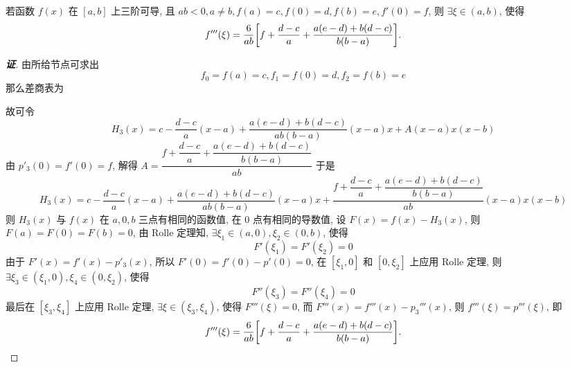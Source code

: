 \begin{theorem}
    若函数 $f(x)\text{ 在 }[a,b]$ 上三阶可导, 且 $ab<0,a\neq b,f(a)=c,f(0)=d,f(b)=e,f'(0)=f$, 则 $\exists\xi\in(a,b)$, 使得 $$f'''(\xi)=\dfrac{6}{ab}\qty[f+\dfrac{d-c}{a}+\dfrac{a(e-d)+b(d-c)}{b(b-a)}].$$
\end{theorem}
\begin{proof}[{\songti \textbf{证}}]
    由所给节点可求出 $$f_0=f(a)=c,f_1=f(0)=d,f_2=f(b)=e$$
    那么差商表为
    \begin{table}[H]
        \centering
        \caption{}
    \end{table}
    故可令 $$H_3(x)=c-\dfrac{d-c}{a}(x-a)+\dfrac{a(e-d)+b(d-c)}{ab(b-a)}(x-a)x+A(x-a)x(x-b)$$
    由 $p'_3(0)=f'(0)=f$, 解得 $A=\dfrac{f+\dfrac{d-c}{a}+\dfrac{a(e-d)+b(d-c)}{b(b-a)}}{ab}$
    于是 $$H_3(x)=c-\dfrac{d-c}{a}(x-a)+\dfrac{a(e-d)+b(d-c)}{ab(b-a)}(x-a)x+\dfrac{f+\dfrac{d-c}{a}+\dfrac{a(e-d)+b(d-c)}{b(b-a)}}{ab}(x-a)x(x-b)$$
    则 $H_3(x)$ 与 $f(x)$ 在 $a,0,b$ 三点有相同的函数值, 在 $0$ 点有相同的导数值, 
    设 $F(x)=f(x)-H_3(x)$, 则 $F(a)=F(0)=F(b)=0$, 由 Rolle 定理知, $\exists\xi_1\in(a,0),\xi_2\in(0,b)$, 使得 $$F'(\xi_1)=F'(\xi_2)=0$$
    由于 $F'(x)=f'(x)-p'_3(x)$, 所以 $F'(0)=f'(0)-p'(0)=0$, 在 $[\xi_1,0]$ 和 $[0,\xi_2]$ 上应用 Rolle 定理, 则 $\exists\xi_3\in(\xi_1,0),\xi_4\in(0,\xi_2)$, 使得 $$F''(\xi_3)=F''(\xi_4)=0$$
    最后在 $[\xi_3,\xi_4]$ 上应用 Rolle 定理, $\exists\xi\in(\xi_3,\xi_4)$, 使得 $F'''(\xi)=0$, 而 $F'''(x)=f'''(x)-p_3'''(x)$, 则 $f'''(\xi)=p'''(\xi)$, 即
    $$f'''(\xi)=\dfrac{6}{ab}\qty[f+\dfrac{d-c}{a}+\dfrac{a(e-d)+b(d-c)}{b(b-a)}].$$
\end{proof}
